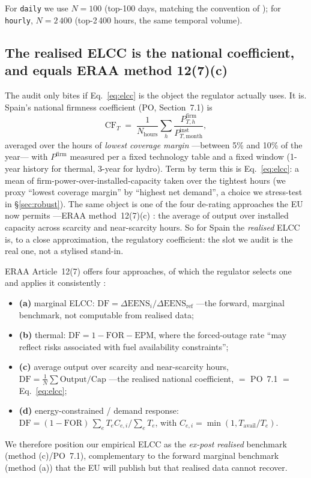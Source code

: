 \documentclass[11pt,a4paper]{article}
\begin{document}
For \texttt{daily} we use $N=100$ (top-100 days, matching the convention of
\citet{entsoe2023}); for \texttt{hourly}, $N=2\,400$ (top-2\,400 hours, the same
temporal volume).

\subsection{The realised ELCC is the national coefficient, and equals ERAA method
12(7)(c)}
\label{sec:keystone}

The audit only bites if Eq.~\ref{eq:elcc} is the object the regulator actually uses.
It is. Spain's national firmness coefficient (PO, Section~7.1) is
\begin{equation}
\mathrm{CF}_T \;=\; \frac{1}{N_{\text{hours}}}\sum_{h}\frac{P^{\text{firm}}_{T,h}}{P^{\text{inst}}_{T,\text{month}}},
\label{eq:cft}
\end{equation}
averaged over the hours of \emph{lowest coverage margin} ---between 5\% and 10\% of the
year--- with $P^{\text{firm}}$ measured per a fixed technology table and a fixed window
(1-year history for thermal, 3-year for hydro). Term by term this is
Eq.~\ref{eq:elcc}: a mean of firm-power-over-installed-capacity taken over the tightest
hours (we proxy ``lowest coverage margin'' by ``highest net demand'', a choice we
stress-test in \S\ref{sec:robust}). The same object is one of the four de-rating
approaches the EU now permits ---ERAA method~12(7)(c) \citep{acer042026}: the average
of output over installed capacity across scarcity and near-scarcity hours. So for Spain
the \emph{realised} ELCC is, to a close approximation, the regulatory coefficient: the
slot we audit is the real one, not a stylised stand-in.

ERAA Article~12(7) offers four approaches, of which the regulator selects one and
applies it consistently \citep{acer042026}:
\begin{itemize}
\item \textbf{(a)} marginal ELCC: $\mathrm{DF}=\Delta\mathrm{EENS}_i/\Delta\mathrm{EENS}_{\text{ref}}$ ---the forward, marginal benchmark, not computable from realised data;
\item \textbf{(b)} thermal: $\mathrm{DF}=1-\mathrm{FOR}-\mathrm{EPM}$, where the forced-outage rate ``may reflect risks associated with fuel availability constraints'';
\item \textbf{(c)} average output over scarcity and near-scarcity hours, $\mathrm{DF}=\tfrac{1}{N}\sum \text{Output}/\text{Cap}$ ---the realised national coefficient, $=$ PO~7.1 $=$ Eq.~\ref{eq:elcc};
\item \textbf{(d)} energy-constrained / demand response: $\mathrm{DF}=(1-\mathrm{FOR})\,\sum_e T_e C_{e,i}/\sum_e T_e$, with $C_{e,i}=\min(1,T_{\text{avail}}/T_e)$.
\end{itemize}
We therefore position our empirical ELCC as the \emph{ex-post realised} benchmark
(method (c)/PO~7.1), complementary to the forward marginal benchmark (method (a)) that
the EU will publish but that realised data cannot recover.
\end{document}

